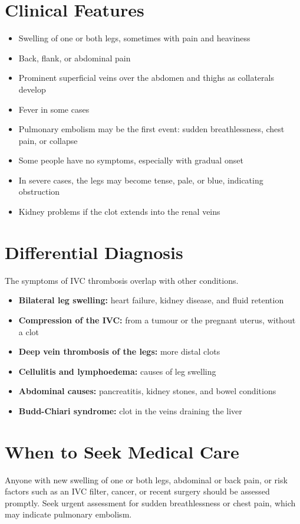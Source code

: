 \section*{Clinical Features}
\begin{itemize}
    \item Swelling of one or both legs, sometimes with pain and heaviness
    \item Back, flank, or abdominal pain
    \item Prominent superficial veins over the abdomen and thighs as collaterals develop
    \item Fever in some cases
    \item Pulmonary embolism may be the first event: sudden breathlessness, chest pain, or collapse
    \item Some people have no symptoms, especially with gradual onset
    \item In severe cases, the legs may become tense, pale, or blue, indicating obstruction
    \item Kidney problems if the clot extends into the renal veins
\end{itemize}

\section*{Differential Diagnosis}
The symptoms of IVC thrombosis overlap with other conditions.
\begin{itemize}
    \item \textbf{Bilateral leg swelling:} heart failure, kidney disease, and fluid retention
    \item \textbf{Compression of the IVC:} from a tumour or the pregnant uterus, without a clot
    \item \textbf{Deep vein thrombosis of the legs:} more distal clots
    \item \textbf{Cellulitis and lymphoedema:} causes of leg swelling
    \item \textbf{Abdominal causes:} pancreatitis, kidney stones, and bowel conditions
    \item \textbf{Budd-Chiari syndrome:} clot in the veins draining the liver
\end{itemize}

\section*{When to Seek Medical Care}
Anyone with new swelling of one or both legs, abdominal or back pain, or risk factors such as an IVC filter, cancer, or recent surgery should be assessed promptly. Seek urgent assessment for sudden breathlessness or chest pain, which may indicate pulmonary embolism.

